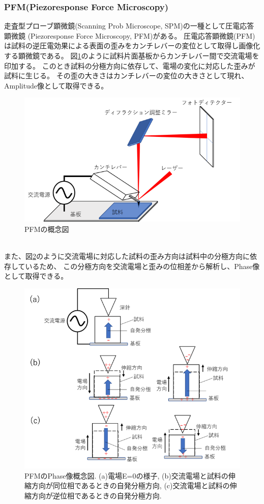 \documentclass[dvipdfmx,12pt,a4paper]{jreport}
\begin{document}
				\subsubsection{PFM(Piezoresponse Force Microscopy)}
				走査型プローブ顕微鏡(Scanning Prob Microscope, SPM)の一種として圧電応答顕微鏡
				(Piezoresponse Force Microscopy, PFM)がある。
				圧電応答顕微鏡(PFM)は試料の逆圧電効果による表面の歪みをカンチレバーの変位として取得し画像化する顕微鏡である。
				図\ref{PFMの概念図}のように試料片面基板からカンチレバー間で交流電場を印加する。
				このとき試料の分極方向に依存して、電場の変化に対応した歪みが試料に生じる。
				その歪の大きさはカンチレバーの変位の大きさとして現れ、
				Amplitude像として取得できる。
				\begin{figure}[h]
					\centering
					\includegraphics{PFM.png}
					\caption{PFMの概念図}
					\label{PFMの概念図}
				\end{figure}
				\\
				また、図\ref{PFM_phaseの概念図}のように交流電場に対応した試料の歪み方向は試料中の分極方向に依存しているため、
				この分極方向を交流電場と歪みの位相差から解析し、Phase像として取得できる。
				\begin{figure}[h]
					\centering
					\includegraphics[width=0.8\linewidth]{PFM_phase.png}
					\caption{PFMのPhase像概念図. (a)電場E=0の様子,
					(b)交流電場と試料の伸縮方向が同位相であるときの自発分極方向, 
					(c)交流電場と試料の伸縮方向が逆位相であるときの自発分極方向.}
					\label{PFM_phaseの概念図}
				\end{figure}
\end{document}
